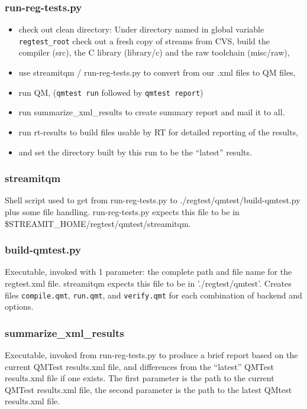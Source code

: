 \documentclass[11pt]{article}
\begin{document}
\subsubsection{run-reg-tests.py}
\begin{itemize}
\item check out clean directory:
 Under directory named in global variable {\tt regtest\_root} check
 out a fresh copy of streams from CVS, build the compiler (src), the C
 library (library/c) and the raw toolchain (misc/raw),
\item use streamitqm / run-reg-tests.py to convert from our .xml files to QM
  files,
\item run QM,  ({\tt qmtest run} followed by  {\tt qmtest report})
\item run summarize\_xml\_results to create summary report and mail it to all.
\item run rt-results to build files usable by RT for detailed
  reporting of the results,
\item and set the directory built by this run to be the ``latest'' results.
\end{itemize}

\subsubsection{streamitqm}
Shell script used to get from run-reg-tests.py to 
./regtest/qmtest/build-qmtest.py
plus some file handling.  run-reg-tests.py expects this file to be in 
\$STREAMIT\_HOME/regtest/qmtest/streamitqm.

\subsubsection{build-qmtest.py}
Executable, invoked with 1 parameter: the complete path and file name for the 
regtest.xml file.  streamitqm expects this file to be in './regtest/qmtest'.
Creates files {\tt compile.qmt}, {\tt run.qmt}, and {\tt verify.qmt}
for each combination of backend and options.

\subsubsection{summarize\_xml\_results}
Executable, invoked from run-reg-tests.py to produce a brief report based on
the current QMTest results.xml file, and differences from the ``latest''
QMTest results.xml file if one exists. The first parameter is the path to
the current QMTest results.xml file, the second parameter is the path to
the latest QMtest results.xml file.
\end{document}
